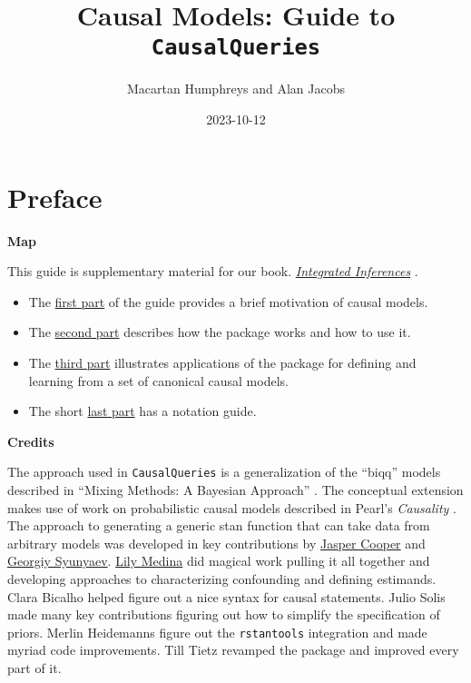 \documentclass[
  12pt,
]{book}
\title{Causal Models: Guide to \texttt{CausalQueries}}
\author{Macartan Humphreys and Alan Jacobs}
\date{2023-10-12}
\providecommand{\tightlist}{%
  \setlength{\itemsep}{0pt}\setlength{\parskip}{0pt}}
\begin{document}
\maketitle

{
\setcounter{tocdepth}{1}
\tableofcontents
}
\hypertarget{preface}{%
\chapter*{Preface}\label{preface}}

\textbf{Map}

This guide is supplementary material for our book. \href{https://integrated-inferences.github.io/}{\emph{Integrated Inferences}} \citep{ii2023}.

\begin{itemize}
\tightlist
\item
  The \protect\hyperlink{cm}{first part} of the guide provides a brief motivation of causal models.
\item
  The \protect\hyperlink{package}{second part} describes how the package works and how to use it.
\item
  The \protect\hyperlink{applications}{third part} illustrates applications of the package for defining and learning from a set of canonical causal models.
\item
  The short \protect\hyperlink{notation}{last part} has a notation guide.
\end{itemize}

\textbf{Credits}

The approach used in \texttt{CausalQueries} is a generalization of the ``biqq'' models described in ``Mixing Methods: A Bayesian Approach'' \citep{humphreys2015mixing}. The conceptual extension makes use of work on probabilistic causal models described in Pearl's \emph{Causality} \citep{pearl2009causality}. The approach to generating a generic stan function that can take data from arbitrary models was developed in key contributions by \href{http://jasper-cooper.com/}{Jasper Cooper} and \href{http://gsyunyaev.com/}{Georgiy Syunyaev}. \href{https://lilymedina.github.io/}{Lily Medina} did magical work pulling it all together and developing approaches to characterizing confounding and defining estimands. Clara Bicalho helped figure out a nice syntax for causal statements. Julio Solis made many key contributions figuring out how to simplify the specification of priors. Merlin Heidemanns figure out the \texttt{rstantools} integration and made myriad code improvements. Till Tietz revamped the package and improved every part of it.
\end{document}
